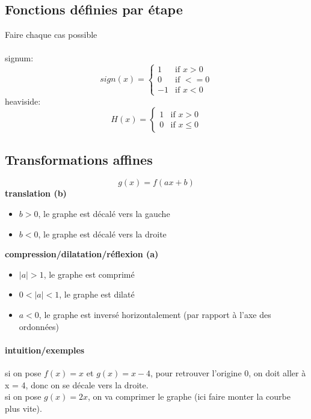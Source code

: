 \documentclass{article}
\begin{document}
\subsection{Fonctions définies par étape}
Faire chaque cas possible \\\\
signum:
\begin{equation}
sign(x)=
    \begin{cases}
        1 & \text{if } x > 0\\
        0 & \text{if } < = 0\\
        -1 & \text{if } x < 0
    \end{cases}
\end{equation}
heaviside:
\begin{equation}
H(x)=
    \begin{cases}
        1 & \text{if } x > 0\\
        0 & \text{if } x \leq 0
    \end{cases}
\end{equation}

\subsection{Transformations affines}

\[ g(x) = f(ax + b) \]
\textbf{translation (b)}
\begin{itemize}
    \item $ b > 0 $, le graphe est décalé vers la gauche
    \item $ b < 0 $, le graphe est décalé vers la droite
\end{itemize}
\textbf{compression/dilatation/réflexion (a)}
\begin{itemize}
    \item $ |a| > 1 $, le graphe est comprimé
    \item $ 0 < |a| < 1 $, le graphe est dilaté
    \item $ a < 0 $, le graphe est inversé horizontalement (par rapport à l'axe des ordonnées)
\end{itemize}

\paragraph{intuition/exemples}
si on pose $ f(x) = x $ et $ g(x) = x - 4 $, pour retrouver l'origine 0, on doit aller à x = 4, donc on se décale vers la droite.\\
si on pose $ g(x) = 2x $, on va comprimer le graphe (ici faire monter la courbe plus vite).
\end{document}
